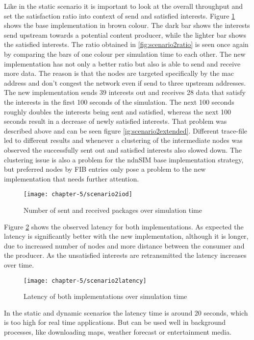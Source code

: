 Like in the static scenario it is important to look at the overall throughput and set the satisfaction ratio into context of send and satisfied interests. Figure \ref{fig:scenario2iod} shows the base implementation in brown colour. The dark bar shows the interests send upstream towards a potential content producer, while the lighter bar shows the satisfied interests. The ratio obtained in \ref{fig:scenario2ratio} is seen once again by comparing the bars of one colour per simulation time to each other. The new implementation has not only a better ratio but also is able to send and receive more data. The reason is that the nodes are targeted specifically by the mac address and don't congest the network even if send to three upstream addresses.
The new implementation sends 39 interests out and receives 28 data that satisfy the interests in the first 100 seconds of the simulation. The next 100 seconds roughly doubles the interests being sent and satisfied, whereas the next 100 seconds result in a decrease of newly satisfied interests. That problem was described above and can be seen figure \ref{ig:scenario2extended}. Different trace-file led to different results and whenever a clustering of the intermediate nodes was observed the successfully sent out and satisfied interests also slowed down. The clustering issue is also a problem for the ndnSIM base implementation strategy, but preferred nodes by FIB entries only pose a problem to the new implementation that needs further attention.

\begin{figure}[H]
  \centering
  \texttt{[image: chapter-5/scenario2iod]}
  \caption{Number of sent and received packages over simulation time}
  \label{fig:scenario2iod}
\end{figure}

Figure \ref{fig:scenario2latency} shows the observed latency for both implementations. As expected the latency is significantly better with the new implementation, although it is longer, due to increased number of nodes and more distance between the consumer and the producer. As the unsatisfied interests are retransmitted the latency increases over time.

\begin{figure}[H]
  \centering
  \texttt{[image: chapter-5/scenario2latency]}
  \caption{Latency of both implementations over simulation time}
  \label{fig:scenario2latency}
\end{figure}

In the static and dynamic scenarios the latency time is around 20 seconds, which is too high for real time applications. But can be used well in background processes, like downloading maps, weather forecast or entertainment media.

